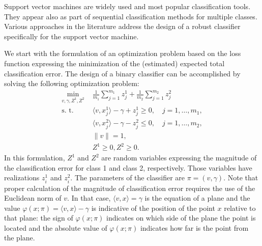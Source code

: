 \documentclass[10pt,letterpaper]{article}
\newcommand{\1}{1{\hskip -2.55 pt}\hbox{I}}
\begin{document}
Support vector machines are widely used and most popular classification tools. They appear also as part of sequential classification methods for multiple classes. Various approaches in the literature address the design of a robust classifier specifically for the support vector machine. 

We start with the formulation of an optimization problem based on the loss function expressing the minimization of the (estimated) expected total classification error.
The design of a binary classifier can be accomplished by solving the following optimization problem:
\begin{equation}
\label{eq:svmE1}
\begin{aligned}
\min_{v,\gamma,Z^1,Z^2}\, &\,  \frac{1}{m_1} \sum_{j=1}^{m_1} z_j^1 + \frac{1}{m_2} \sum_{j=1}^{m_2} z_j^2  \\
\text{s. t. }\, & \, \langle v, x_j^1\rangle - \gamma + z_j^1 \ge 0, \quad j=1,\dots,m_1,\\
&\, \langle v, x_{j}^2\rangle -\gamma  - z_{j}^2 \le 0, \quad j=1,\dots,m_2,\\
&\, \|v\|=1,\\
&\, Z^1\ge 0, Z^2\geq 0.
\end{aligned}
\end{equation}
In this formulation, $Z^1$ and $Z^2$ are random variables expressing the magnitude of the classification error for class 1 and class 2, respectively. 
Those variables have realizations $z_i^1$ and $z_i^2$. The parameters of the classifier are
$\pi = (v,\gamma)$. Note that proper calculation of the magnitude of classification error requires the use 
of the Euclidean norm of $v$. In that case,  $\langle v, x\rangle =\gamma$ is the equation of a plane and the value $\varphi(x;\pi)=\langle v, x\rangle -\gamma$ is
indicative of the position of the point $x$ relative to that plane: the sign of $\varphi(x;\pi)$ indicates on which side of the plane the point is located and the absolute value of $\varphi(x;\pi)$ indicates how far is the point from the plane. 
\end{document}
